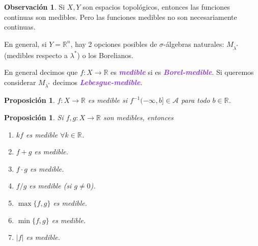 \documentclass{article}
\newtheorem{proposition}[theorem]{Proposición}
\theoremstyle{definition}
\newtheorem*{obs}{Observación}
\theoremstyle{remark}
\numberwithin{equation}{section}
\newcommand{\A}{\mathcal{A}}
\newcommand{\R}{\mathbb{R}}
\newcommand{\lam}{\lambda}
\newcommand{\oo}{\infty}
\newcommand{\abs}[1]{\left| #1 \right|}
\newcommand{\wea}[1]{\textcolor{BlueViolet}{\textbf{\emph{#1}}}}
\begin{document}
\begin{obs}
  Si $X,Y$ son espacios topológicos, entonces las funciones continuas son medibles. Pero las funciones medibles no son necesariamente continuas.

  En general, si $Y = \R^n$, hay 2 opciones posibles de \( \sigma \)-álgebras naturales: $M_{\lam^*}$ (medibles respecto a $\lam^*$) o los Borelianos.

  En general decimos que $f \colon X \to \R$ es \wea{medible} si es \wea{Borel-medible}. Si queremos considerar $M_{\lam^*}$ decimos \wea{Lebesgue-medible}.
\end{obs}

\begin{proposition}
  $f \colon X \to \R$ es medible si $f^{-1}(-\oo,b] \in \A$ para todo $b \in \R$.
\end{proposition}

\begin{proposition}
  Si $f,g \colon X \to \R$ son medibles, entonces
  \begin{enumerate}[(1)]
    \item $kf$ es medible $\forall k \in \R$.
    \item $f+g$ es medible.
    \item $f \cdot g$ es medible.
    \item $f/g$ es medible (si $g \neq 0$).
    \item $\max\{f,g\}$ es medible.
    \item $\min\{f,g\}$ es medible.
    \item $\abs f$ es medible.
  \end{enumerate}
\end{proposition}
\end{document}
